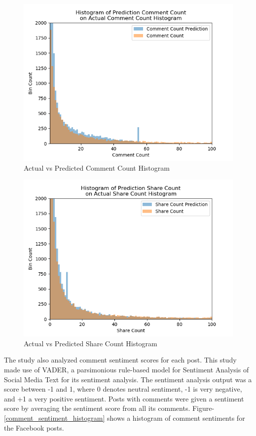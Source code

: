 \documentclass{article}
\begin{document}
\begin{figure}
\centering
\includegraphics[width=\columnwidth]{images/Comment_Count_Prediction_vs_Actual.png}
\caption{Actual vs Predicted Comment Count Histogram}
\label{comment_count_histogram}
\end{figure}

\begin{figure}
\centering
\includegraphics[width=\columnwidth]{images/Share_Count_Prediction_vs_Actual.png}
\caption{Actual vs Predicted Share Count Histogram}
\label{share_count_histogram}
\end{figure}

The study also analyzed comment sentiment scores for each post. This study made use of VADER, a parsimonious rule-based model for Sentiment Analysis of Social Media Text \cite{Gilbert} for its sentiment analysis. The sentiment analysis output was a score between -1 and 1, where 0 denotes neutral sentiment, -1 is very negative, and +1 a very positive sentiment. Posts with comments were given a sentiment score by averaging the sentiment score from all its comments.  Figure-\ref{comment_sentiment_histogram} shows a histogram of comment sentiments for the Facebook posts.
\end{document}

